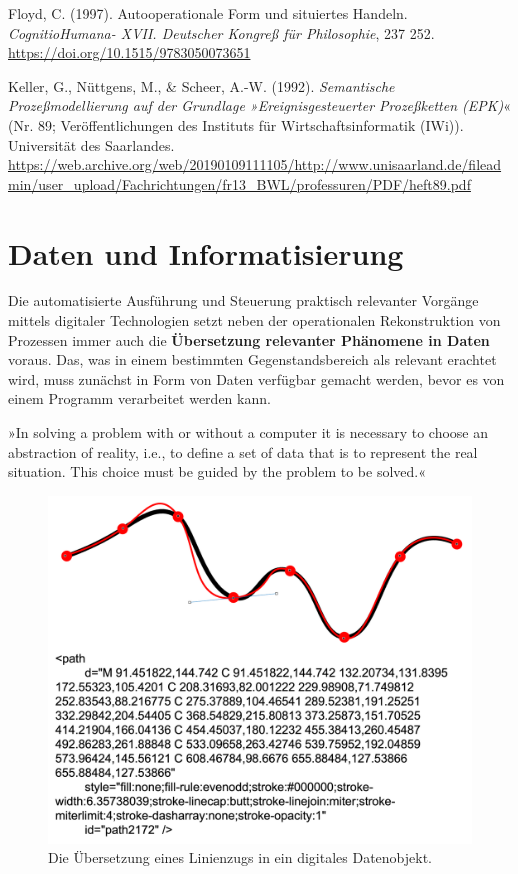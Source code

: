 \documentclass[
  a4paper,
]{book}
\begin{document}
Floyd, C. (1997). Autooperationale Form und situiertes Handeln. \emph{CognitioHumana- XVII. Deutscher Kongreß für Philosophie}, 237
252. \url{https://doi.org/10.1515/9783050073651}

Keller, G., Nüttgens, M., \& Scheer, A.-W. (1992). \emph{Semantische Prozeßmodellierung auf der Grundlage »Ereignisgesteuerter Prozeßketten (EPK)}« (Nr. 89; Veröffentlichungen des Instituts für Wirtschaftsinformatik (IWi)). Universität des Saarlandes. \url{https://web.archive.org/web/20190109111105/http://www.unisaarland.de/fileadmin/user_upload/Fachrichtungen/fr13_BWL/professuren/PDF/heft89.pdf}

\chapter{Daten und Informatisierung}\label{daten-und-informatisierung}

Die automatisierte Ausführung und Steuerung praktisch relevanter Vorgänge mittels digitaler Technologien setzt neben der operationalen Rekonstruktion von Prozessen immer auch die \textbf{Übersetzung relevanter Phänomene in Daten} voraus. Das, was in einem bestimmten Gegenstandsbereich als relevant erachtet wird, muss zunächst in Form von Daten verfügbar gemacht werden, bevor es von einem Programm verarbeitet werden kann.

»In solving a problem with or without a computer it is necessary to choose an abstraction of reality, i.e., to define a set of data that is to represent the real situation. This choice must be guided by the problem to be solved.« \citep{wirthAlgorithmsDataStructures1976}

\begin{figure}

{\centering \includegraphics{Figures/10-01} 

}

\caption{Die Übersetzung eines Linienzugs in ein digitales Datenobjekt.}\label{fig:fig15}
\end{figure}
\end{document}
